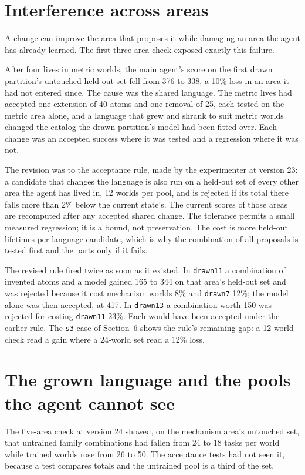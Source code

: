\documentclass[11pt]{article}
\begin{document}
\section{Interference across areas}

A change can improve the area that proposes it while damaging an area the agent has already learned. The first three-area check exposed exactly this failure.

After four lives in metric worlds, the main agent's score on the first drawn partition's untouched held-out set fell from 376 to 338, a 10\% loss in an area it had not entered since. The cause was the shared language. The metric lives had accepted one extension of 40 atoms and one removal of 25, each tested on the metric area alone, and a language that grew and shrank to suit metric worlds changed the catalog the drawn partition's model had been fitted over. Each change was an accepted success where it was tested and a regression where it was not.

The revision was to the acceptance rule, made by the experimenter at version 23: a candidate that changes the language is also run on a held-out set of every other area the agent has lived in, 12 worlds per pool, and is rejected if its total there falls more than 2\% below the current state's. The current scores of those areas are recomputed after any accepted shared change. The tolerance permits a small measured regression; it is a bound, not preservation. The cost is more held-out lifetimes per language candidate, which is why the combination of all proposals is tested first and the parts only if it fails.

The revised rule fired twice as soon as it existed. In \texttt{drawn11} a combination of invented atoms and a model gained 165 to 344 on that area's held-out set and was rejected because it cost mechanism worlds 8\% and \texttt{drawn7} 12\%; the model alone was then accepted, at 417. In \texttt{drawn13} a combination worth 150 was rejected for costing \texttt{drawn11} 23\%. Each would have been accepted under the earlier rule. The \texttt{s3} case of Section~6 shows the rule's remaining gap: a 12-world check read a gain where a 24-world set read a 12\% loss.

\section{The grown language and the pools the agent cannot see}

The five-area check at version 24 showed, on the mechanism area's untouched set, that untrained family combinations had fallen from 24 to 18 tasks per world while trained worlds rose from 26 to 50. The acceptance tests had not seen it, because a test compares totals and the untrained pool is a third of the set.
\end{document}
